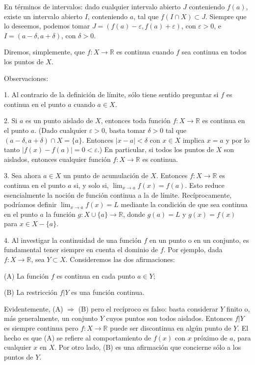 \documentclass[12pt,oneside]{book}
\begin{document}
En términos de intervalos: dado cualquier intervalo abierto \(J\) conteniendo \(f(a)\), existe un intervalo abierto \(I\), conteniendo \(a\), tal que \(f(I \cap X) \subset J\). Siempre que lo deseemos, podemos tomar \(J = (f(a) - \varepsilon, f(a) + \varepsilon)\), con \(\varepsilon > 0\), e \(I = (a - \delta, a + \delta)\), con \(\delta > 0\).

Diremos, simplemente, que \(f: X \to \mathbb{R}\) es continua cuando \(f\) sea continua en todos los puntos de \(X\).

Observaciones:

1. Al contrario de la definición de límite, sólo tiene sentido preguntar si \(f\) es continua en el punto \(a\) cuando \(a \in X\).

2. Si \(a\) es un punto aislado de \(X\), entonces toda función \(f: X \to \mathbb{R}\) es continua en el punto \(a\). (Dado cualquier \(\varepsilon > 0\), basta tomar \(\delta > 0\) tal que \((a - \delta, a + \delta) \cap X = \{a\}\). Entonces \(|x - a| < \delta\) con \(x \in X\) implica \(x = a\) y por lo tanto \(|f(x) - f(a)| = 0 < \varepsilon\).) En particular, si todos los puntos de \(X\) son aislados, entonces cualquier función \(f: X \to \mathbb{R}\) es continua.

3. Sea ahora \(a \in X\) un punto de acumulación de \(X\). Entonces \(f: X \to \mathbb{R}\) es continua en el punto \(a\) si, y solo si, \(\lim_{x \to a} f(x) = f(a)\). Esto reduce esencialmente la noción de función continua a la de límite. Recíprocamente, podríamos definir \(\lim_{x \to a} f(x) = L\) mediante la condición de que sea continua en el punto \(a\) la función \(g: X \cup \{a\} \to \mathbb{R}\), donde \(g(a) = L\) y \(g(x) = f(x)\) para \(x \in X - \{a\}\).

4. Al investigar la continuidad de una función \(f\) en un punto o en un conjunto, es fundamental tener siempre en cuenta el dominio de \(f\). Por ejemplo, dada \(f: X \to \mathbb{R}\), sea \(Y \subset X\). Consideremos las dos afirmaciones:

(A) La función \(f\) es continua en cada punto \(a \in Y\);

(B) La restricción \(f|Y\) es una función continua.

Evidentemente, (A) \(\Rightarrow\) (B) pero el recíproco es falso: basta considerar \(Y\) finito o, más generalmente, un conjunto \(Y\) cuyos puntos son todos aislados. Entonces \(f|Y\) es siempre continua pero \(f: X \to \mathbb{R}\) puede ser discontinua en algún punto de \(Y\). El hecho es que (A) se refiere al comportamiento de \(f(x)\) con \(x\) próximo de \(a\), para cualquier \(x\) en \(X\). Por otro lado, (B) es una afirmación que concierne sólo a los puntos de \(Y\).
\end{document}
